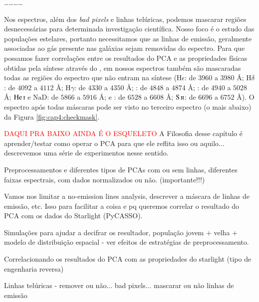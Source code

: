 \ldots \dots \ldots \ldots

Nos espectros, além dos {\em bad pixels} e linhas telúricas, podemos mascarar regiões desnecessárias para determinada
investigação científica. Nosso foco é o estudo das populações estelares, portanto necessitamos que as linhas de emissão,
geralmente associadas ao gás presente nas galáxias \fixme sejam removidas do espectro. Para que possamos fazer
correlações entre os resultados do PCA e as propriedades físicas obtidas pela síntese através do \starlight, em nossos
espectros também são mascaradas todas as regiões do espectro que não entram na síntese ($\mathrm{H}\epsilon$: de $3960$
a $3980$ \AA; $\mathrm{H}\delta$: de $4092$ a $4112$ \AA; $\mathrm{H}\gamma$: de $4330$ a $4350$ \AA; \Hbeta: de $4848$
a $4874$ \AA; \oIII: de $4940$ a $5028$ \AA; $\mathrm{He\,\textsc{i}}$ e $\mathrm{NaD}$: de $5866$ a $5916$ \AA; \Halpha
e \nII: de $6528$ a $6608$ \AA; $\mathrm{S\,\textsc{ii}}$: de $6696$ a $6752$ \AA). O espectro após todas máscaras pode
ser visto no terceiro espectro (o mais abaixo) da Figura \ref{fig:cap4:checkmask}.


\textcolor{red}{DAQUI PRA BAIXO AINDA É O ESQUELETO}
\ojo A Filosofia desse capítulo é aprender/testar como operar o PCA para que ele
reflita isso ou aquilo... descrevemos uma série de experimentos nesse sentido.

Preprocessamentos e diferentes tipos de PCAs com ou sem linhas, diferentes
faixas espectrais, com dados normalizados ou não. (importante!!!)

Vamos nos limitar a no-emission lines analysis, descrever a máscara de linhas de
emissão, etc. Isso para facilitar a coisa e pq queremos correlar o resultado do
PCA com os dados do Starlight (PyCASSO).

Simulações para ajudar a decifrar os resultador, população jovem + velha +
modelo de distribuição espacial - ver efeitos de estratégias de
preprocessamento.

Correlacionando os resultados do PCA com as propriedades do starlight (tipo de
engenharia reversa)

Linhas telúricas - remover ou não... bad pixels... mascarar ou não linhas de
emissão